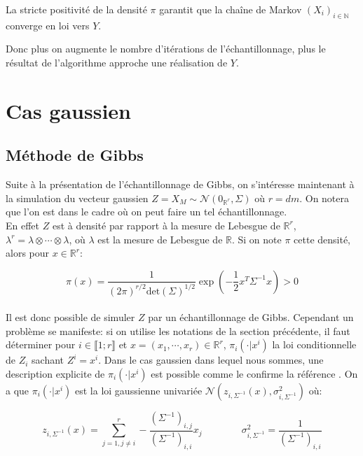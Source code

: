 \begin{property}
\label{convergence} La stricte positivité de la densité $\pi$ garantit que la chaîne de Markov $(X_i)_{i \in \mathbb{N}}$ converge en loi vers $Y$.
\end{property}

\noindent Donc plus on augmente le nombre d'itérations de l'échantillonnage,
plus le résultat de l'algorithme approche une réalisation de $Y$.
\newpage
\section{Cas gaussien}

\subsection{Méthode de Gibbs}

\label{gibbs1} Suite à la présentation de l'échantillonnage de Gibbs, on s'intéresse maintenant à la simulation du vecteur gaussien $Z = X_M \sim \mathcal{N}(0_{\mathbb{R}^{r}},\Sigma)$
où $r = dm$.
On notera que l'on est dans le cadre où on peut faire un tel échantillonnage.\\ En effet $Z$ est à densité par rapport à la mesure de Lebesgue de $\mathbb{R}^{r}$,
$\lambda^r = \lambda \otimes \cdots \otimes \lambda$, où $\lambda$ est la mesure de Lebesgue de $\mathbb{R}$. Si on note $\pi$ cette densité, alors pour $x \in \mathbb{R}^{r}$:

\begin{equation*}
\pi(x) = \frac{1}{(2\pi)^{r/2} \mathrm{det}(\Sigma)^{1/2}} \exp(-\frac{1}{2}x^{T}\Sigma^{-1}x) > 0
\end{equation*}
~\\
Il est donc possible de simuler $Z$ par un échantillonnage de Gibbs. Cependant un
problème se manifeste: si on utilise les notations de la section précédente,
il faut déterminer pour $i \in \llbracket 1;r \rrbracket $ et $x = (x_1, \cdots, x_r) \in \mathbb{R}^{r}$,
$\pi_i(\cdot |x^i)$ la loi conditionnelle de $Z_i$ sachant $Z^i = x^i$. Dans le
cas gaussien dans lequel nous sommes, une description explicite de
$\pi_i(\cdot |x^i)$ est possible comme le confirme la référence \cite{Lantujoul2012SimulationOA}. On a que
$\pi_i(\cdot |x^i)$ est la loi gaussienne univariée $\mathcal{N}(z_{i,\Sigma^{-1}}(x), \sigma_{i,\Sigma^{-1}}^2)$ où:

\begin{equation*}
z_{i,\Sigma^{-1}}(x) = \displaystyle\sum_{j = 1, j \neq i}^{r} -\frac{(\Sigma^{-1})_{i,j}}{(\Sigma^{-1})_{i,i}} x_j \qquad \qquad \sigma_{i,\Sigma^{-1}}^2 = \frac{1}{(\Sigma^{-1})_{i,i}}
\end{equation*}
~\\

